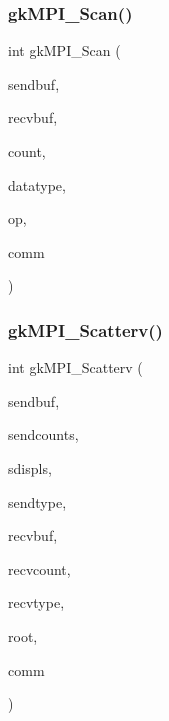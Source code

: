 \mbox{\label{a00951_a8f9cc3ccf10cef3753659c596da87bb3}} 
\subsubsection{\texorpdfstring{gk\+M\+P\+I\+\_\+\+Scan()}{gkMPI\_Scan()}}
{\footnotesize\ttfamily int gk\+M\+P\+I\+\_\+\+Scan (\begin{DoxyParamCaption}\item[{void $\ast$}]{sendbuf,  }\item[{void $\ast$}]{recvbuf,  }\item[{\hyperlink{a00876_aaa5262be3e700770163401acb0150f52}{idx\+\_\+t}}]{count,  }\item[{M\+P\+I\+\_\+\+Datatype}]{datatype,  }\item[{M\+P\+I\+\_\+\+Op}]{op,  }\item[{M\+P\+I\+\_\+\+Comm}]{comm }\end{DoxyParamCaption})}

\mbox{\label{a00951_a08990d66eed081828d6addc2e5affde3}} 
\subsubsection{\texorpdfstring{gk\+M\+P\+I\+\_\+\+Scatterv()}{gkMPI\_Scatterv()}}
{\footnotesize\ttfamily int gk\+M\+P\+I\+\_\+\+Scatterv (\begin{DoxyParamCaption}\item[{void $\ast$}]{sendbuf,  }\item[{\hyperlink{a00876_aaa5262be3e700770163401acb0150f52}{idx\+\_\+t} $\ast$}]{sendcounts,  }\item[{\hyperlink{a00876_aaa5262be3e700770163401acb0150f52}{idx\+\_\+t} $\ast$}]{sdispls,  }\item[{M\+P\+I\+\_\+\+Datatype}]{sendtype,  }\item[{void $\ast$}]{recvbuf,  }\item[{\hyperlink{a00876_aaa5262be3e700770163401acb0150f52}{idx\+\_\+t}}]{recvcount,  }\item[{M\+P\+I\+\_\+\+Datatype}]{recvtype,  }\item[{\hyperlink{a00876_aaa5262be3e700770163401acb0150f52}{idx\+\_\+t}}]{root,  }\item[{M\+P\+I\+\_\+\+Comm}]{comm }\end{DoxyParamCaption})}

